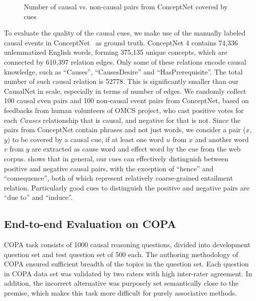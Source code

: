 \begin{figure*}[th]
\centering
{}
\caption{Number of causal vs. non-causal pairs from ConceptNet covered by cues}
\label{fig:pattern2}
\end{figure*}

To evaluate the quality of the causal cues, we make use of the
manually labeled causal events in
ConceptNet~\cite{liu2004commonsense} as ground truth. ConceptNet 4
contains 74,336 unlemmatized English words, forming
375,135 unique concepts, which are connected by 610,397 relation edges.
Only some of these relations encode causal knowledge,
such as ``Causes'', ``CausesDesire'' and ``HasPrerequisite''.
The total number of such causal relation is 52778.
This is significantly smaller than our
CausalNet in scale, especially in terms of number of edges.
We randomly collect 100 causal even pairs and 100 non-causal event pairs from
ConceptNet,
based on feedbacks from human volunteers of OMCS project, who cast positive
votes for each \emph{Causes} relationship that is causal, and
negative for that is not. Since the pairs from ConceptNet contain
phrases and not just words, we consider a pair ($x$, $y$) to be covered by a
causal cue, if at least one word $u$ from $x$ and another word $v$ from
$y$ are extracted as cause word and effect word by the cue
from the web corpus.
 shows that in general, our cues can
effectively distinguish between positive and negative causal pairs,
with the exception of ``hence'' and ``consequence'', both of which
represent relatively coarse-grained entailment relation.
Particularly good cues to distinguish the positive and negative
pairs are ``due to'' and ``induce''.






\subsection{End-to-end Evaluation on COPA}
COPA task consists of 1000 causal reasoning questions, divided into
development question set and test question set of 500 each.
The authoring methodology of COPA ensured sufficient breadth of the topics
in the question set. Each question in COPA data set was validated
by two raters with high inter-rater agreement.
In addition, the incorrect alternative was purposely set semantically
close to the premise, which makes this task more difficult for
purely associative methods.

